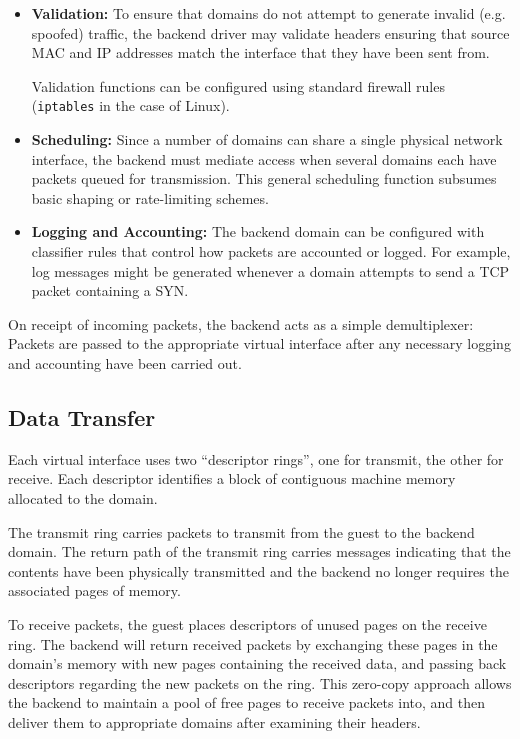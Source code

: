\documentclass[11pt,twoside,final,openright,a4paper]{report}
\begin{document}
\begin{itemize}
\item {\bf Validation:} To ensure that domains do not attempt to
  generate invalid (e.g. spoofed) traffic, the backend driver may
  validate headers ensuring that source MAC and IP addresses match the
  interface that they have been sent from.

  Validation functions can be configured using standard firewall rules
  ({\small{\tt iptables}} in the case of Linux).
  
\item {\bf Scheduling:} Since a number of domains can share a single
  physical network interface, the backend must mediate access when
  several domains each have packets queued for transmission.  This
  general scheduling function subsumes basic shaping or rate-limiting
  schemes.
  
\item {\bf Logging and Accounting:} The backend domain can be
  configured with classifier rules that control how packets are
  accounted or logged.  For example, log messages might be generated
  whenever a domain attempts to send a TCP packet containing a SYN.
\end{itemize}

On receipt of incoming packets, the backend acts as a simple
demultiplexer: Packets are passed to the appropriate virtual interface
after any necessary logging and accounting have been carried out.

\subsection{Data Transfer}

Each virtual interface uses two ``descriptor rings'', one for
transmit, the other for receive.  Each descriptor identifies a block
of contiguous machine memory allocated to the domain.

The transmit ring carries packets to transmit from the guest to the
backend domain.  The return path of the transmit ring carries messages
indicating that the contents have been physically transmitted and the
backend no longer requires the associated pages of memory.

To receive packets, the guest places descriptors of unused pages on
the receive ring.  The backend will return received packets by
exchanging these pages in the domain's memory with new pages
containing the received data, and passing back descriptors regarding
the new packets on the ring.  This zero-copy approach allows the
backend to maintain a pool of free pages to receive packets into, and
then deliver them to appropriate domains after examining their
headers.
\end{document}
